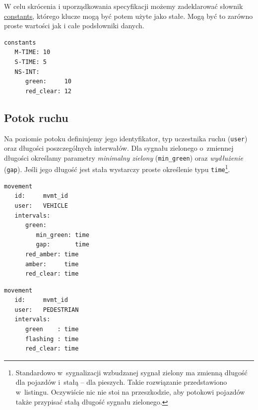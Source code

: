 \documentclass{pracamgr}
\theoremstyle{plain}
\begin{document}
W celu skrócenia i uporządkowania specyfikacji możemy zadeklarować słownik
\url{constants}, którego klucze mogą być potem użyte jako stałe. Mogą
być to zarówno proste wartości jak i całe podsłowniki danych.

\noindent\begin{minipage}{1.0\linewidth}
\begin{lstlisting}[caption=Słownik stałych.]
constants
   M-TIME: 10
   S-TIME: 5
   NS-INT:
      green:     10
      red_clear: 12
\end{lstlisting}
\end{minipage}

\subsection{Potok ruchu}
Na poziomie potoku definiujemy jego identyfikator, typ uczestnika
ruchu (\texttt{user}) oraz długości poszczególnych interwałów.  Dla
sygnału zielonego o~zmiennej długości określamy parametry
\emph{minimalny zielony} (\texttt{min\_green}) oraz \emph{wydłużenie}
(\texttt{gap}). Jeśli jego długość jest stała wystarczy proste
określenie typu \texttt{time}\footnote{Standardowo w~sygnalizacji
  wzbudzanej sygnał zielony ma zmienną długość dla pojazdów i~stałą --
dla pieszych. Takie rozwiązanie przedstawiono w~listingu. Oczywiście
nic nie stoi na przeszkodzie, aby potokowi pojazdów także przypisać
stałą długość sygnału zielonego.}.

\noindent\begin{minipage}{1.0\linewidth}
\begin{lstlisting}[caption=Schemat opisu potoku pojazdów.]
movement
   id:     mvmt_id
   user:   VEHICLE
   intervals:
      green:
         min_green: time
         gap:       time
      red_amber: time
      amber:     time
      red_clear: time
\end{lstlisting}
\end{minipage}

\noindent\begin{minipage}{1.0\linewidth}
\begin{lstlisting}[caption=Schemat opisu dla potoku pieszych.]
movement
   id:     mvmt_id
   user:   PEDESTRIAN
   intervals:
      green    : time
      flashing : time
      red_clear: time
\end{lstlisting}
\end{minipage}
\end{document}
